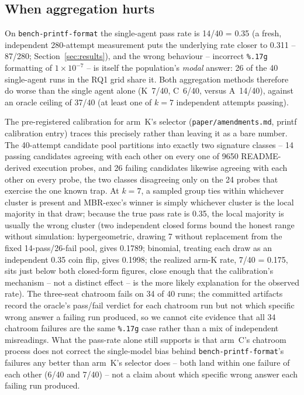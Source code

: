 \subsection{When aggregation hurts}
\label{sec:discussion-hurts}

On \texttt{bench-printf-format} the single-agent pass rate is 14/40 = 0.35 (a fresh, independent
280-attempt measurement puts the underlying rate closer to 0.311 -- 87/280; Section~\ref{sec:results}),
and the wrong behaviour -- incorrect \texttt{\%.17g} formatting of $1\times 10^{-7}$ -- is itself the
population's \emph{modal} answer: 26 of the 40 single-agent runs in the RQ1 grid share it. Both
aggregation methods therefore do worse than the single agent alone (K~7/40, C~6/40, versus A~14/40),
against an oracle ceiling of 37/40 (at least one of $k=7$ independent attempts passing).

The pre-registered calibration for arm~K's selector (\texttt{paper/amendments.md}, printf calibration
entry) traces this precisely rather than leaving it as a bare number. The 40-attempt candidate pool
partitions into exactly two signature classes -- 14 passing candidates agreeing with each other on
every one of 9650 README-derived execution probes, and 26 failing candidates likewise agreeing with
each other on every probe, the two classes disagreeing only on the 24 probes that exercise the one
known trap. At $k=7$, a sampled group ties within whichever cluster is present and MBR-exec's winner is
simply whichever cluster is the local majority in that draw; because the true pass rate is 0.35, the
local majority is usually the wrong cluster (two independent closed forms bound the honest range without
simulation: hypergeometric, drawing 7 without replacement from the fixed 14-pass/26-fail pool, gives
0.1789; binomial, treating each draw as an independent 0.35 coin flip, gives 0.1998; the realized arm-K
rate, 7/40 = 0.175, sits just below both closed-form figures, close enough that the calibration's
mechanism -- not a distinct effect -- is the more likely explanation for the observed rate). The
three-seat chatroom fails on 34 of 40 runs; the
committed artifacts record the oracle's pass/fail verdict for each chatroom run but not which specific
wrong answer a failing run produced, so we cannot cite evidence that all 34 chatroom failures are the
same \texttt{\%.17g} case rather than a mix of independent misreadings. What the pass-rate alone still
supports is that arm~C's chatroom process does not correct the single-model bias behind
\texttt{bench-printf-format}'s failures any better than arm~K's selector does -- both land within one
failure of each other (6/40 and 7/40) -- not a claim about which specific wrong answer each failing run
produced.


